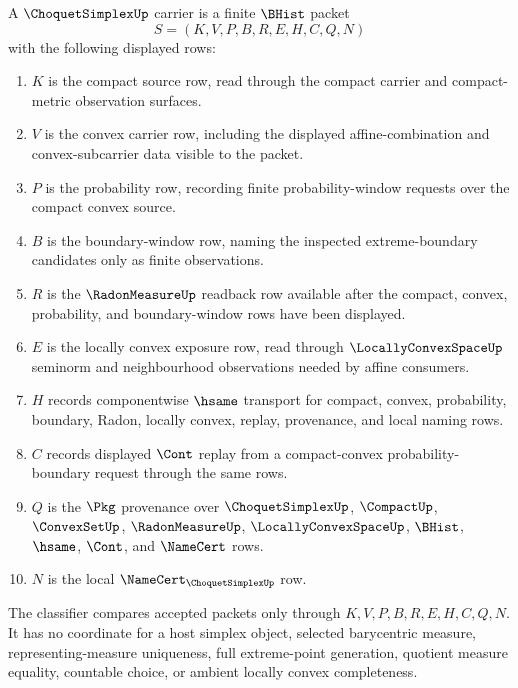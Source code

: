 \begin{definition}
\label{def:choquet-simplex-carrier-surface}
A $\ChoquetSimplexUp$ carrier is a finite $\BHist$ packet
$$
S=(K,V,P,B,R,E,H,C,Q,N)
$$
with the following displayed rows:
\begin{enumerate}
\item $K$ is the compact source row, read through the compact carrier and compact-metric observation surfaces.
\item $V$ is the convex carrier row, including the displayed affine-combination and convex-subcarrier data visible to the packet.
\item $P$ is the probability row, recording finite probability-window requests over the compact convex source.
\item $B$ is the boundary-window row, naming the inspected extreme-boundary candidates only as finite observations.
\item $R$ is the $\RadonMeasureUp$ readback row available after the compact, convex, probability, and boundary-window rows have been displayed.
\item $E$ is the locally convex exposure row, read through $\LocallyConvexSpaceUp$ seminorm and neighbourhood observations needed by affine consumers.
\item $H$ records componentwise $\hsame$ transport for compact, convex, probability, boundary, Radon, locally convex, replay, provenance, and local naming rows.
\item $C$ records displayed $\Cont$ replay from a compact-convex probability-boundary request through the same rows.
\item $Q$ is the $\Pkg$ provenance over $\ChoquetSimplexUp$, $\CompactUp$, $\ConvexSetUp$, $\RadonMeasureUp$, $\LocallyConvexSpaceUp$, $\BHist$, $\hsame$, $\Cont$, and $\NameCert$ rows.
\item $N$ is the local $\NameCert_{\ChoquetSimplexUp}$ row.
\end{enumerate}
The classifier compares accepted packets only through $K,V,P,B,R,E,H,C,Q,N$. It has no coordinate for a host simplex object, selected barycentric measure, representing-measure uniqueness, full extreme-point generation, quotient measure equality, countable choice, or ambient locally convex completeness.
\end{definition}


